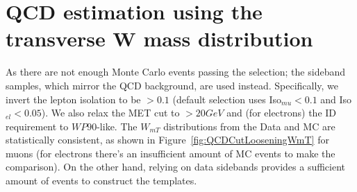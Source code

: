\section{QCD estimation using the transverse W mass distribution}
\label{sec:qcdWithWmT}
As there are not enough Monte Carlo events passing the selection; 
the sideband samples, which mirror the QCD background, are used
instead. Specifically, we invert the lepton isolation to be $>0.1$
(default selection uses Iso$_{mu}<0.1$ and Iso$_{el}<0.05$). 
We also relax the MET cut to $>20GeV$ and (for electrons) the ID  
requirement to $WP90$-like. 
The $W_{mT}$ distributions from the Data and MC are
statistically consistent, as shown in Figure~\ref{fig:QCDCutLooseningWmT}
for muons (for electrons there's an insufficient amount of MC events
to make the comparison). 
On the other hand, relying on data sidebands provides a
sufficient amount of events to construct the templates. 


